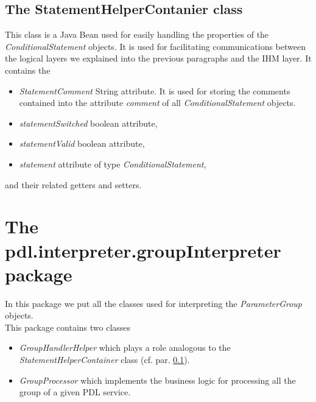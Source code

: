 \documentclass[a4paper,11pt] {ivoa}
\begin{document}
\subsection{The StatementHelperContanier class}\label{StatementHelperContainer}
This class is a Java Bean used for easily handling the properties of the {\it ConditionalStatement} objects. It is used for facilitating communications between the logical layers we explained into the previous paragraphs and the IHM layer. It contains the 
\begin{itemize}
\item {\it StatementComment} String attribute. It is used for storing the comments contained into the attribute {\it comment} of all {\it ConditionalStatement} objects.
\item {\it statementSwitched} boolean attribute,
\item {\it statementValid} boolean attribute,
\item {\it statement} attribute of type {\it ConditionalStatement},
\end{itemize}
and their related getters and setters.

\section{The pdl.interpreter.groupInterpreter package}
In this package we put all the classes used for interpreting the {\it ParameterGroup} objects.\\
This package contains two classes
\begin{itemize}
\item {\it GroupHandlerHelper} which plays a role analogous to the {\it StatementHelperContainer} class (cf. par. \ref{StatementHelperContainer}).
\item {\it GroupProcessor} which implements the business logic for processing all the group of a given PDL service.
\end{itemize}
\end{document}
